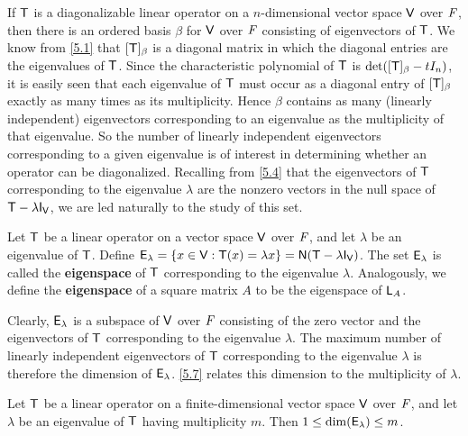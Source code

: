\begin{note}
  If \(\mathsf{T}\) is a diagonalizable linear operator on a \(n\)-dimensional vector space \(\mathsf{V}\) over \(\mathit{F}\), then there is an ordered basis \(\beta\) for \(\mathsf{V}\) over \(\mathit{F}\) consisting of eigenvectors of \(\mathsf{T}\).
  We know from \cref{5.1} that \([\mathsf{T}]_{\beta}\) is a diagonal matrix in which the diagonal entries are the eigenvalues of \(\mathsf{T}\).
  Since the characteristic polynomial of \(\mathsf{T}\) is \(\det([\mathsf{T}]_{\beta} - t I_n)\), it is easily seen that each eigenvalue of \(\mathsf{T}\) must occur as a diagonal entry of \([\mathsf{T}]_{\beta}\) exactly as many times as its multiplicity.
  Hence \(\beta\) contains as many (linearly independent) eigenvectors corresponding to an eigenvalue as the multiplicity of that eigenvalue.
  So the number of linearly independent eigenvectors corresponding to a given eigenvalue is of interest in determining whether an operator can be diagonalized.
  Recalling from \cref{5.4} that the eigenvectors of \(\mathsf{T}\) corresponding to the eigenvalue \(\lambda\) are the nonzero vectors in the null space of \(\T - \lambda \IT[\V]\), we are led naturally to the study of this set.
\end{note}

\begin{defn}\label{5.2.4}
  Let \(\mathsf{T}\) be a linear operator on a vector space \(\mathsf{V}\) over \(\mathit{F}\), and let \(\lambda\) be an eigenvalue of \(\mathsf{T}\).
  Define \(\vs{E}_\lambda = \set{x \in \V : \T(x) = \lambda x} = \ns{\T - \lambda \IT[\V]}\).
  The set \(\mathsf{E}_\lambda\) is called the \textbf{eigenspace} of \(\mathsf{T}\) corresponding to the eigenvalue \(\lambda\).
  Analogously, we define the \textbf{eigenspace} of a square matrix \(A\) to be the eigenspace of \(\mathsf{L}_A\).
\end{defn}

\begin{note}
  Clearly, \(\mathsf{E}_{\lambda}\) is a subspace of \(\mathsf{V}\) over \(\mathit{F}\) consisting of the zero vector and the eigenvectors of \(\mathsf{T}\) corresponding to the eigenvalue \(\lambda\).
  The maximum number of linearly independent eigenvectors of \(\mathsf{T}\) corresponding to the eigenvalue \(\lambda\) is therefore the dimension of \(\mathsf{E}_{\lambda}\).
  \cref{5.7} relates this dimension to the multiplicity of \(\lambda\).
\end{note}

\begin{thm}\label{5.7}
  Let \(\mathsf{T}\) be a linear operator on a finite-dimensional vector space \(\mathsf{V}\) over \(\mathit{F}\), and let \(\lambda\) be an eigenvalue of \(\mathsf{T}\) having multiplicity \(m\).
  Then \(1 \leq \dim(\mathsf{E}_{\lambda}) \leq m\).
\end{thm}

